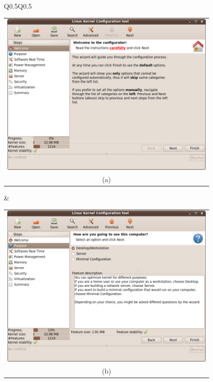 \documentclass{chi2009}
\begin{document}
\begin{figure}[!t]
 \centering
 \begin{tabular}{Q{0.5\textwidth}Q{0.5\textwidth}}
 \begin{tabular}{c}
  \includegraphics[scale=0.25,keepaspectratio=true]{figs/lkc-final1} \\
  (a) \\
 \end{tabular}
  & 
\begin{tabular}{c}
  \includegraphics[scale=0.25,keepaspectratio=true]{figs/lkc-final2} \\
  (b) \\
 \end{tabular} \\

\end{tabular}
\end{figure}
\end{document}
